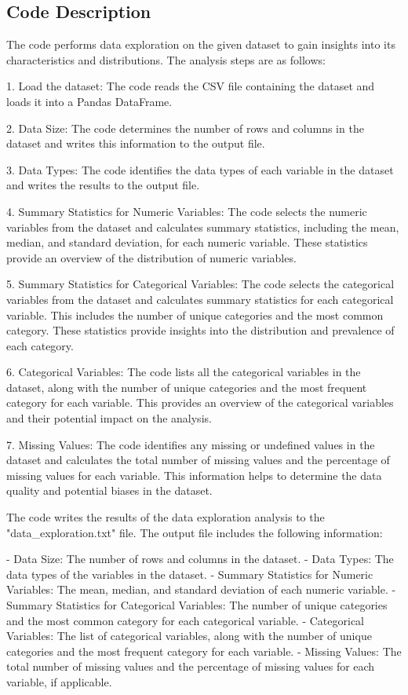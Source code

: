\documentclass[11pt]{article}
\begin{document}
\subsection{Code Description}

The code performs data exploration on the given dataset to gain insights into its characteristics and distributions. The analysis steps are as follows:

1. Load the dataset: The code reads the CSV file containing the dataset and loads it into a Pandas DataFrame.

2. Data Size: The code determines the number of rows and columns in the dataset and writes this information to the output file.

3. Data Types: The code identifies the data types of each variable in the dataset and writes the results to the output file.

4. Summary Statistics for Numeric Variables: The code selects the numeric variables from the dataset and calculates summary statistics, including the mean, median, and standard deviation, for each numeric variable. These statistics provide an overview of the distribution of numeric variables.

5. Summary Statistics for Categorical Variables: The code selects the categorical variables from the dataset and calculates summary statistics for each categorical variable. This includes the number of unique categories and the most common category. These statistics provide insights into the distribution and prevalence of each category.

6. Categorical Variables: The code lists all the categorical variables in the dataset, along with the number of unique categories and the most frequent category for each variable. This provides an overview of the categorical variables and their potential impact on the analysis.

7. Missing Values: The code identifies any missing or undefined values in the dataset and calculates the total number of missing values and the percentage of missing values for each variable. This information helps to determine the data quality and potential biases in the dataset.

The code writes the results of the data exploration analysis to the "data\_exploration.txt" file. The output file includes the following information:

- Data Size: The number of rows and columns in the dataset.
- Data Types: The data types of the variables in the dataset.
- Summary Statistics for Numeric Variables: The mean, median, and standard deviation of each numeric variable.
- Summary Statistics for Categorical Variables: The number of unique categories and the most common category for each categorical variable.
- Categorical Variables: The list of categorical variables, along with the number of unique categories and the most frequent category for each variable.
- Missing Values: The total number of missing values and the percentage of missing values for each variable, if applicable.
\end{document}
